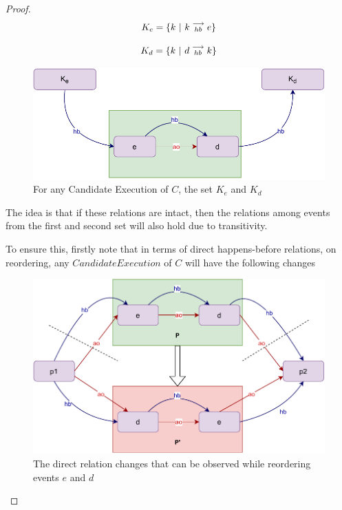 \begin{proof}
        \[
            K_e = \{k \ | \ \reln{k}{hb}{e} \}
        \]
        
        \[
            K_d = \{k \ | \ d\stackrel{\longrightarrow}{_{hb}}k \}
        \]
        
        \begin{figure}[H]
            \centering
            \includegraphics[scale=0.7]{Q1(a).pdf}
            \caption{For any Candidate Execution of $C$, the set $K_e$ and $K_d$}
            \label{fig:my_label}
        \end{figure}
        
        The idea is that if these relations are intact, then the relations among events from the first and second set will also hold due to transitivity.
        
        To ensure this, firstly note that in terms of direct happens-before relations, on reordering, any $Candidate Execution$ of $C$ will have the following changes
        
        \begin{figure}[H]
            \centering
            \includegraphics[scale=0.7]{Q1(b).pdf}
            \caption{The direct relation changes that can be observed while reordering events $e$ and $d$}
            \label{fig:my_label}
        \end{figure}
        

\end{proof}
